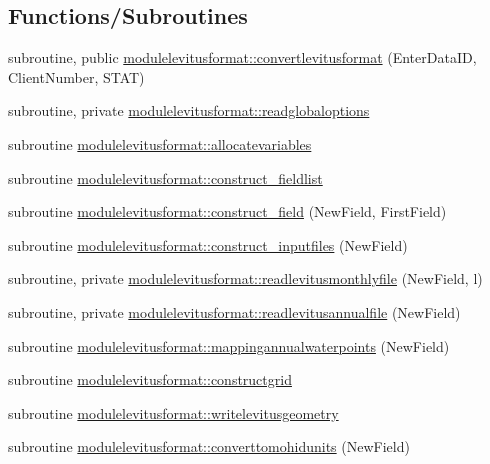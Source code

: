 \subsection*{Functions/\+Subroutines}
\begin{DoxyCompactItemize}
\item 
subroutine, public \mbox{\hyperlink{namespacemodulelevitusformat_a7849fb124c87ab2b4867b47c45ae92db}{modulelevitusformat\+::convertlevitusformat}} (Enter\+Data\+ID, Client\+Number, S\+T\+AT)
\item 
subroutine, private \mbox{\hyperlink{namespacemodulelevitusformat_a3776b26027a1df5b06714f551024abed}{modulelevitusformat\+::readglobaloptions}}
\item 
subroutine \mbox{\hyperlink{namespacemodulelevitusformat_a1666412a426a4d69b36a48bbb07feb9e}{modulelevitusformat\+::allocatevariables}}
\item 
subroutine \mbox{\hyperlink{namespacemodulelevitusformat_a283a6fb7f680ba1855b1e20b95906146}{modulelevitusformat\+::construct\+\_\+fieldlist}}
\item 
subroutine \mbox{\hyperlink{namespacemodulelevitusformat_a1dfa75e5e2a006d4bcbca7bbb3e74ced}{modulelevitusformat\+::construct\+\_\+field}} (New\+Field, First\+Field)
\item 
subroutine \mbox{\hyperlink{namespacemodulelevitusformat_a3771e94f5b1b7829553eba0cea20546a}{modulelevitusformat\+::construct\+\_\+inputfiles}} (New\+Field)
\item 
subroutine, private \mbox{\hyperlink{namespacemodulelevitusformat_abe175ce441457a68d1d3d191baa3732a}{modulelevitusformat\+::readlevitusmonthlyfile}} (New\+Field, l)
\item 
subroutine, private \mbox{\hyperlink{namespacemodulelevitusformat_aefc320bae22e2d949151376118a03ce4}{modulelevitusformat\+::readlevitusannualfile}} (New\+Field)
\item 
subroutine \mbox{\hyperlink{namespacemodulelevitusformat_aeaf32cef0849c2f2d279062a6a41696a}{modulelevitusformat\+::mappingannualwaterpoints}} (New\+Field)
\item 
subroutine \mbox{\hyperlink{namespacemodulelevitusformat_a8d2f6c0620be1ea52eadbd9f59b02100}{modulelevitusformat\+::constructgrid}}
\item 
subroutine \mbox{\hyperlink{namespacemodulelevitusformat_a6b331414c3615b8cf034262b51b17a6b}{modulelevitusformat\+::writelevitusgeometry}}
\item 
subroutine \mbox{\hyperlink{namespacemodulelevitusformat_a9df551d282255b0ecad476a5078996da}{modulelevitusformat\+::converttomohidunits}} (New\+Field)

\end{DoxyCompactItemize}

